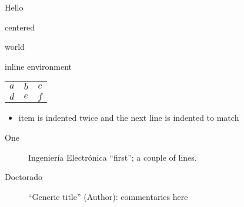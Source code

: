 \documentclass{minimal}
\begin{document}
  Hello
      \begin{centering} centered \end{centering}
    world

\begin{outer}
  \begin{inner} inline environment \end{inner}
\end{outer}

\begin{tabular}{%
  ccc}
  $a$ & $b$ & $c$ \\
  $d$ & $e$ & $f$
\end{tabular}

\begin{itemize}
\item item is indented twice
      and the next line is indented to match
  \end{itemize}

  \begin{description}
    \item[One] Ingeniería Electrónica ``first'';
    a couple of lines.
  \item[Doctorado] ``Generic title''
    (Author): commentaries here
  \end{description}
\end{document}
